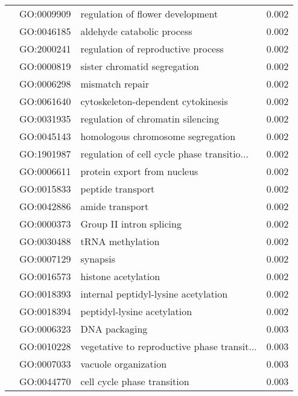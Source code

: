 \begin{longtable}{lllr}
   & GO:0009909 &             regulation of flower development &         0.002 \\
   & GO:0046185 &                   aldehyde catabolic process &         0.002 \\
   & GO:2000241 &           regulation of reproductive process &         0.002 \\
   & GO:0000819 &                 sister chromatid segregation &         0.002 \\
   & GO:0006298 &                              mismatch repair &         0.002 \\
   & GO:0061640 &           cytoskeleton-dependent cytokinesis &         0.002 \\
   & GO:0031935 &            regulation of chromatin silencing &         0.002 \\
   & GO:0045143 &            homologous chromosome segregation &         0.002 \\
   & GO:1901987 &  regulation of cell cycle phase transitio... &         0.002 \\
   & GO:0006611 &                  protein export from nucleus &         0.002 \\
   & GO:0015833 &                            peptide transport &         0.002 \\
   & GO:0042886 &                              amide transport &         0.002 \\
   & GO:0000373 &                     Group II intron splicing &         0.002 \\
   & GO:0030488 &                             tRNA methylation &         0.002 \\
   & GO:0007129 &                                     synapsis &         0.002 \\
   & GO:0016573 &                          histone acetylation &         0.002 \\
   & GO:0018393 &         internal peptidyl-lysine acetylation &         0.002 \\
   & GO:0018394 &                  peptidyl-lysine acetylation &         0.002 \\
   & GO:0006323 &                                DNA packaging &         0.003 \\
   & GO:0010228 &  vegetative to reproductive phase transit... &         0.003 \\
   & GO:0007033 &                         vacuole organization &         0.003 \\
   & GO:0044770 &                  cell cycle phase transition &         0.003 \\

\end{longtable}
